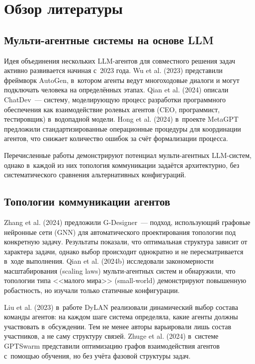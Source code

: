 \documentclass[12pt, a4paper]{article}
\begin{document}
\section{Обзор литературы}

\subsection{Мульти-агентные системы на основе LLM}

Идея объединения нескольких LLM-агентов для совместного решения задач активно развивается начиная с~2023 года. Wu et al. (2023) представили фреймворк AutoGen, в~котором агенты ведут многоходовые диалоги и могут подключать человека на определённых этапах. Qian et al. (2024) описали ChatDev~--- систему, моделирующую процесс разработки программного обеспечения как взаимодействие ролевых агентов (CEO, программист, тестировщик) в~водопадной модели. Hong et al. (2024) в~проекте MetaGPT предложили стандартизированные операционные процедуры для координации агентов, что снижает количество ошибок за счёт формализации процесса.

Перечисленные работы демонстрируют потенциал мульти-агентных LLM-систем, однако в~каждой из них топология коммуникации задаётся архитектурно, без систематического сравнения альтернативных конфигураций.

\subsection{Топологии коммуникации агентов}

Zhang et al. (2024) предложили G-Designer~--- подход, использующий графовые нейронные сети (GNN) для автоматического проектирования топологии под конкретную задачу. Результаты показали, что оптимальная структура зависит от характера задачи, однако выбор происходит однократно и не пересматривается в~ходе выполнения. Qian et al. (2024b) исследовали закономерности масштабирования (scaling laws) мульти-агентных систем и обнаружили, что топологии типа <<малого мира>> (small-world) демонстрируют повышенную робастность, но изучали только статичные конфигурации.

Liu et al. (2023) в~работе DyLAN реализовали динамический выбор состава команды агентов: на каждом шаге система определяла, какие агенты должны участвовать в~обсуждении. Тем не менее авторы варьировали лишь состав участников, а не саму структуру связей. Zhuge et al. (2024) в~системе GPTSwarm представили оптимизацию графов взаимодействия агентов с~помощью обучения, но без учёта фазовой структуры задач.
\end{document}
